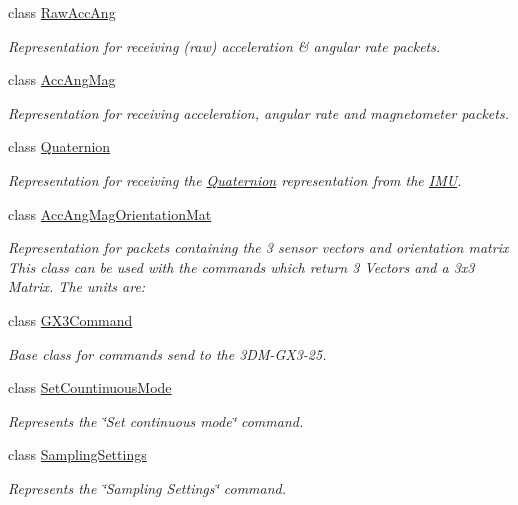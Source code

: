 \begin{DoxyCompactItemize}
class \hyperlink{class_u_s_u_1_1_raw_acc_ang}{\-Raw\-Acc\-Ang}
\begin{DoxyCompactList}\small\item\em \-Representation for receiving (raw) acceleration \& angular rate packets. \end{DoxyCompactList}\item 
class \hyperlink{class_u_s_u_1_1_acc_ang_mag}{\-Acc\-Ang\-Mag}
\begin{DoxyCompactList}\small\item\em \-Representation for receiving acceleration, angular rate and magnetometer packets. \end{DoxyCompactList}\item 
class \hyperlink{class_u_s_u_1_1_quaternion}{\-Quaternion}
\begin{DoxyCompactList}\small\item\em \-Representation for receiving the \hyperlink{class_u_s_u_1_1_quaternion}{\-Quaternion} representation from the \hyperlink{class_i_m_u}{\-I\-M\-U}. \end{DoxyCompactList}\item 
class \hyperlink{class_u_s_u_1_1_acc_ang_mag_orientation_mat}{\-Acc\-Ang\-Mag\-Orientation\-Mat}
\begin{DoxyCompactList}\small\item\em \-Representation for packets containing the 3 sensor vectors and orientation matrix \-This class can be used with the commands which return 3 \-Vectors and a 3x3 \-Matrix. \-The units are\-: \end{DoxyCompactList}\item 
class \hyperlink{class_u_s_u_1_1_g_x3_command}{\-G\-X3\-Command}
\begin{DoxyCompactList}\small\item\em \-Base class for commands send to the 3\-D\-M-\/\-G\-X3-\/25. \end{DoxyCompactList}\item 
class \hyperlink{class_u_s_u_1_1_set_countinuous_mode}{\-Set\-Countinuous\-Mode}
\begin{DoxyCompactList}\small\item\em \-Represents the \char`\"{}\-Set continuous mode\char`\"{} command. \end{DoxyCompactList}\item 
class \hyperlink{class_u_s_u_1_1_sampling_settings}{\-Sampling\-Settings}
\begin{DoxyCompactList}\small\item\em \-Represents the \char`\"{}\-Sampling Settings\char`\"{} command. \end{DoxyCompactList}\item 

\end{DoxyCompactItemize}
